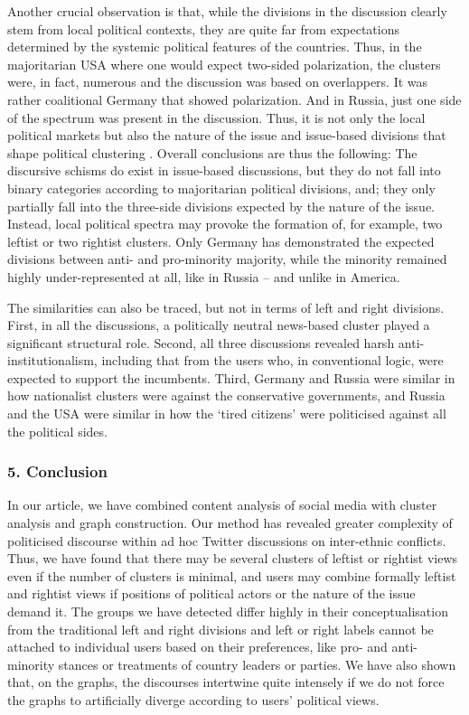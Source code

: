 Another crucial observation is that, while the divisions in the discussion clearly stem from local political contexts, they are quite far from expectations determined by the systemic political features of the countries. Thus, in the majoritarian USA where one would expect two-sided polarization, the clusters were, in fact, numerous and the discussion was based on overlappers. It was rather coalitional Germany that showed polarization. And in Russia, just one side of the spectrum was present in the discussion. Thus, it is not only the local political markets but also the nature of the issue and issue-based divisions that shape political clustering
.
Overall conclusions are thus the following: The discursive schisms do exist in issue-based discussions, but they do not fall into binary categories according to majoritarian political divisions, and; they only partially fall into the three-side divisions expected by the nature of the issue. Instead, local political spectra may provoke the formation of, for example, two leftist or two rightist clusters. Only Germany has demonstrated the expected divisions between anti- and pro-minority majority, while the minority remained highly under-represented at all, like in Russia -- and unlike in America.

The similarities can also be traced, but not in terms of left and right divisions. First, in all the discussions, a politically neutral news-based cluster played a significant structural role. Second, all three discussions revealed harsh anti-institutionalism, including that from the users who, in conventional logic, were expected to support the incumbents. Third, Germany and Russia were similar in how nationalist clusters were against the conservative governments, and Russia and the USA were similar in how the ‘tired citizens’ were politicised against all the political sides.

\subsubsection{5. Conclusion}

In our article, we have combined content analysis of social media with cluster analysis and graph construction. Our method has revealed greater complexity of politicised discourse within ad hoc Twitter discussions on inter-ethnic conflicts. Thus, we have found that there may be several clusters of leftist or rightist views even if the number of clusters is minimal, and users may combine formally leftist and rightist views if positions of political actors or the nature of the issue demand it. The groups we have detected differ highly in their conceptualisation from the traditional left and right divisions and left or right labels cannot be attached to individual users based on their preferences, like pro- and anti-minority stances or treatments of country leaders or parties. We have also shown that, on the graphs, the discourses intertwine quite intensely if we do not force the graphs to artificially diverge according to users’ political views.

